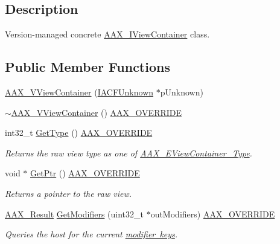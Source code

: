 \subsection{Description}
Version-\/managed concrete \mbox{\hyperlink{a01889}{A\+A\+X\+\_\+\+I\+View\+Container}} class. \subsection*{Public Member Functions}
\begin{DoxyCompactItemize}
\item 
\mbox{\hyperlink{a01945_aac7bd02ee005502da1d1b81667ced4a3}{A\+A\+X\+\_\+\+V\+View\+Container}} (\mbox{\hyperlink{a01409}{I\+A\+C\+F\+Unknown}} $\ast$p\+Unknown)
\item 
\mbox{\hyperlink{a01945_a5b4e7392fa1cb28912bf6e5456984cc0}{$\sim$\+A\+A\+X\+\_\+\+V\+View\+Container}} () \mbox{\hyperlink{a00392_ac2f24a5172689ae684344abdcce55463}{A\+A\+X\+\_\+\+O\+V\+E\+R\+R\+I\+DE}}
\item 
int32\+\_\+t \mbox{\hyperlink{a01945_a2d1b4bc3d5ff813a4761fd0200073be7}{Get\+Type}} () \mbox{\hyperlink{a00392_ac2f24a5172689ae684344abdcce55463}{A\+A\+X\+\_\+\+O\+V\+E\+R\+R\+I\+DE}}
\begin{DoxyCompactList}\small\item\em Returns the raw view type as one of \mbox{\hyperlink{a00503_ab4c36de253fc80b541eb51074c64caef}{A\+A\+X\+\_\+\+E\+View\+Container\+\_\+\+Type}}. \end{DoxyCompactList}\item 
void $\ast$ \mbox{\hyperlink{a01945_a8cb4bb50d773b0f37ad38ca8d2bb3ada}{Get\+Ptr}} () \mbox{\hyperlink{a00392_ac2f24a5172689ae684344abdcce55463}{A\+A\+X\+\_\+\+O\+V\+E\+R\+R\+I\+DE}}
\begin{DoxyCompactList}\small\item\em Returns a pointer to the raw view. \end{DoxyCompactList}\item 
\mbox{\hyperlink{a00392_a4d8f69a697df7f70c3a8e9b8ee130d2f}{A\+A\+X\+\_\+\+Result}} \mbox{\hyperlink{a01945_acdc71a4c6bd536bbd3be11635c1ff514}{Get\+Modifiers}} (uint32\+\_\+t $\ast$out\+Modifiers) \mbox{\hyperlink{a00392_ac2f24a5172689ae684344abdcce55463}{A\+A\+X\+\_\+\+O\+V\+E\+R\+R\+I\+DE}}
\begin{DoxyCompactList}\small\item\em Queries the host for the current \mbox{\hyperlink{a00491_a47756e0a56d00468b7045eb26500cb78}{modifier keys}}. \end{DoxyCompactList}\item 

\end{DoxyCompactItemize}
